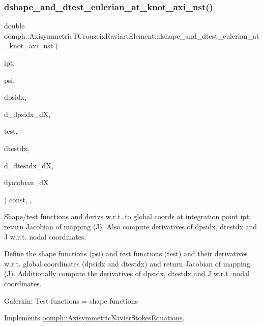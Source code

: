 \subsubsection{\texorpdfstring{dshape\+\_\+and\+\_\+dtest\+\_\+eulerian\+\_\+at\+\_\+knot\+\_\+axi\+\_\+nst()}{dshape\_and\_dtest\_eulerian\_at\_knot\_axi\_nst()}\hspace{0.1cm}{\footnotesize\ttfamily [2/2]}}
{\footnotesize\ttfamily double oomph\+::\+Axisymmetric\+T\+Crouzeix\+Raviart\+Element\+::dshape\+\_\+and\+\_\+dtest\+\_\+eulerian\+\_\+at\+\_\+knot\+\_\+axi\+\_\+nst (\begin{DoxyParamCaption}\item[{const unsigned \&}]{ipt,  }\item[{\hyperlink{classoomph_1_1Shape}{Shape} \&}]{psi,  }\item[{\hyperlink{classoomph_1_1DShape}{D\+Shape} \&}]{dpsidx,  }\item[{\hyperlink{classoomph_1_1RankFourTensor}{Rank\+Four\+Tensor}$<$ double $>$ \&}]{d\+\_\+dpsidx\+\_\+dX,  }\item[{\hyperlink{classoomph_1_1Shape}{Shape} \&}]{test,  }\item[{\hyperlink{classoomph_1_1DShape}{D\+Shape} \&}]{dtestdx,  }\item[{\hyperlink{classoomph_1_1RankFourTensor}{Rank\+Four\+Tensor}$<$ double $>$ \&}]{d\+\_\+dtestdx\+\_\+dX,  }\item[{\hyperlink{classoomph_1_1DenseMatrix}{Dense\+Matrix}$<$ double $>$ \&}]{djacobian\+\_\+dX }\end{DoxyParamCaption}) const\hspace{0.3cm}{\ttfamily [inline]}, {\ttfamily [protected]}, {\ttfamily [virtual]}}



Shape/test functions and derivs w.\+r.\+t. to global coords at integration point ipt; return Jacobian of mapping (J). Also compute derivatives of dpsidx, dtestdx and J w.\+r.\+t. nodal coordinates. 

Define the shape functions (psi) and test functions (test) and their derivatives w.\+r.\+t. global coordinates (dpsidx and dtestdx) and return Jacobian of mapping (J). Additionally compute the derivatives of dpsidx, dtestdx and J w.\+r.\+t. nodal coordinates.

Galerkin\+: Test functions = shape functions 

Implements \hyperlink{classoomph_1_1AxisymmetricNavierStokesEquations_a2cd0715a679af81bd0e3d7448a5560cb}{oomph\+::\+Axisymmetric\+Navier\+Stokes\+Equations}.



